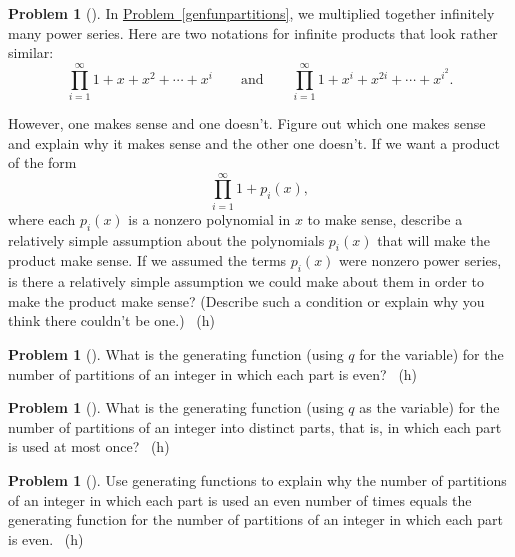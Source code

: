 \documentclass[10pt,]{book}
\theoremstyle{plain}
\theoremstyle{definition}
\newtheorem{activity}[project]{Problem}
\theoremstyle{definition}
\numberwithin{equation}{chapter}
\newcommand{\importantarrow}{\Rightarrow}
\begin{document}
\begin{activity}[]\marginsymbol[-1em]{\pdftooltip{$\importantarrow$}{especially interesting}} \label{activity-204}
\hypertarget{p-1167}{}%
In \hyperref[genfunpartitions]{Problem~\ref{genfunpartitions}}, we multiplied together infinitely many power series. Here are two notations for infinite products that look rather similar:%
\begin{equation*}
\prod_{i=1}^\infty 1 + x + x^2 +\cdots+ x^i\qquad\mbox{and}\qquad
\prod_{i=1}^\infty 1 +x^i +x^{2i} +\cdots + x^{i^2}.
\end{equation*}
%
\par
\hypertarget{p-1168}{}%
However, one makes sense and one doesn't. Figure out which one makes sense and explain why it makes sense and the other one doesn't. If we want a product of the form%
\begin{equation*}
\prod_{i=1}^\infty 1 +p_i(x),
\end{equation*}
where each \(p_i(x)\) is a nonzero polynomial in \(x\) to make sense, describe a relatively simple assumption about the polynomials \(p_i(x)\) that will make the product make sense. If we assumed the terms \(p_i(x)\) were nonzero power series, is there a relatively simple assumption we could make about them in order to make the product make sense? (Describe such a condition or explain why you think there couldn't be one.)%
~{\tiny (h)}\end{activity}
\begin{activity}[] \label{activity-205}
\hypertarget{p-1171}{}%
What is the generating function (using \(q\) for the variable) for the number of partitions of an integer in which each part is even?%
~{\tiny (h)}\end{activity}
\begin{activity}[] \label{activity-206}
\hypertarget{p-1174}{}%
What is the generating function (using \(q\) as the variable) for the number of partitions of an integer into distinct parts, that is, in which each part is used at most once?%
~{\tiny (h)}\end{activity}
\begin{activity}[] \label{activity-207}
\hypertarget{p-1177}{}%
Use generating functions to explain why the number of partitions of an integer in which each part is used an even number of times equals the generating function for the number of partitions of an integer in which each part is even.%
~{\tiny (h)}\end{activity}
\end{document}
